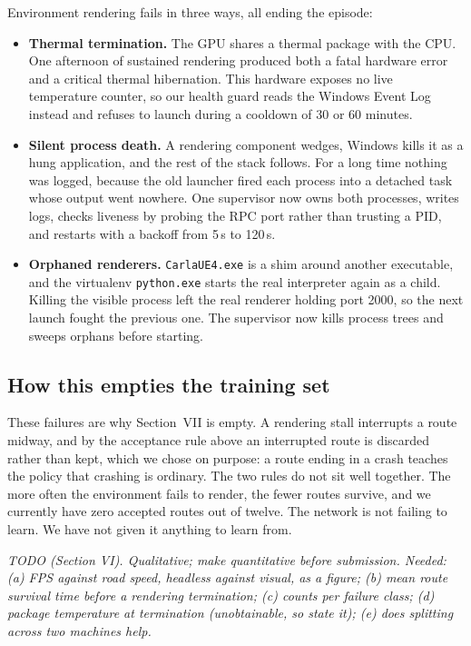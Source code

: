 \documentclass[conference]{IEEEtran}
\newcommand{\TODO}[1]{%
  \begingroup
  \setlength{\FrameSep}{4pt}%
  \def\FrameCommand{{\color{gray!55}\vrule width 1.2pt}\hspace{5pt}}%
  \MakeFramed{\advance\hsize-\width \FrameRestore}%
  \noindent\scriptsize\itshape\color{gray!80}#1%
  \endMakeFramed
  \endgroup}
\begin{document}
Environment rendering fails in three ways, all ending the episode:

\begin{itemize}
\setlength{\itemsep}{1pt}\setlength{\topsep}{2pt}
\setlength{\parskip}{0pt}\setlength{\partopsep}{0pt}
\item \textbf{Thermal termination.} The GPU shares a thermal package
with the CPU. One afternoon of sustained rendering produced both a fatal
hardware error and a critical thermal hibernation. This hardware exposes
no live temperature counter, so our health guard reads the Windows Event
Log instead and refuses to launch during a cooldown of 30 or 60 minutes.
\item \textbf{Silent process death.} A rendering component wedges,
Windows kills it as a hung application, and the rest of the stack
follows. For a long time nothing was logged, because the old launcher
fired each process into a detached task whose output went nowhere. One
supervisor now owns both processes, writes logs, checks liveness by
probing the RPC port rather than trusting a PID, and restarts with a
backoff from 5\,s to 120\,s.
\item \textbf{Orphaned renderers.} \texttt{CarlaUE4.exe} is a shim
around another executable, and the virtualenv \texttt{python.exe} starts
the real interpreter again as a child. Killing the visible process left
the real renderer holding port 2000, so the next launch fought the
previous one. The supervisor now kills process trees and sweeps orphans
before starting.
\end{itemize}

\subsection{How this empties the training set}

These failures are why Section~VII is empty. A rendering stall
interrupts a route midway, and by the acceptance rule above an
interrupted route is discarded rather than kept, which we chose on
purpose: a route ending in a crash teaches the policy that crashing is
ordinary. The two rules do not sit well together. The more often the
environment fails to render, the fewer routes survive, and we currently
have zero accepted routes out of twelve. The network is not failing to
learn. We have not given it anything to learn from.

\TODO{TODO (Section VI). Qualitative; make quantitative before
submission. Needed: (a) FPS against road speed, headless against visual,
as a figure; (b) mean route survival time before a rendering
termination; (c) counts per failure class; (d) package temperature at
termination (unobtainable, so state it); (e) does splitting across two
machines help.}
\end{document}
